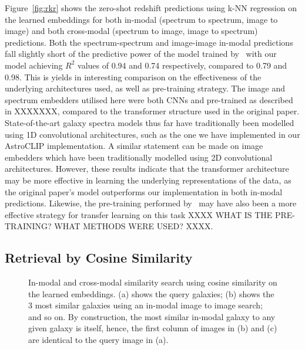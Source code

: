 Figure~\eqref{fig:rkr} shows the zero-shot redshift predictions using k-NN regression on the learned embeddings for
both in-modal (spectrum to spectrum, image to image) and both cross-modal (spectrum to image, image to spectrum) predictions.
Both the spectrum-spectrum and image-image in-modal predictions fall slightly short of the predictive power of the
model trained by~\cite{astroclip} with our model achieving $R^{2}$ values of 0.94 and 0.74 respectively, compared to
0.79 and 0.98.
This is yields in interesting comparison on the effectiveness of the underlying architectures used, as well as pre-training
strategy.
The image and spectrum embedders utilised here were both CNNs and pre-trained as described in XXXXXXX, compared
to the transformer structure used in the original paper.
State-of-the-art galaxy spectra models thus far have traditionally been modelled using 1D convolutional architectures,
such as the one we have implemented in our AstroCLIP implementation.
A similar statement can be made on image embedders which have been traditionally modelled using 2D convolutional architectures.
However, these results indicate that the transformer architecture may be more effective in learning the underlying
representations of the data, as the original paper's model outperforms our implementation in both in-modal predictions.
Likewise, the pre-training performed by~\cite{astroclip} may have also been a more effective strategy for transfer learning
on this task XXXX WHAT IS THE PRE-TRAINING? WHAT METHODS WERE USED? XXXX.

\subsection{Retrieval by Cosine Similarity}\label{subsec:results-retrieval}
\begin{figure}[htb]
    \centering
    \caption{In-modal and cross-modal similarity search using cosine similarity on the learned embeddings.
        (a) shows the query galaxies; (b) shows the 3 most similar galaxies using an in-modal image to image search; and
        so on.
        By construction, the most similar in-modal galaxy to any given galaxy is itself, hence, the first column of images
        in (b) and (c) are identical to the query image in (a).}
    \label{fig:ssia}
\end{figure}

